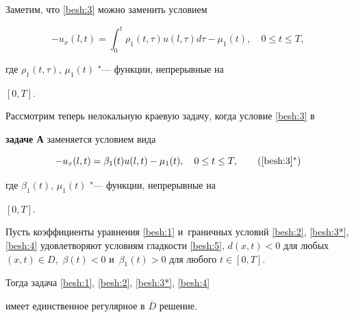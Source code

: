 Заметим, что \eqref{besh:3} можно заменить условием

$$

-u_{x}(l,t)=\int^{t}_{0}\rho_{1}(t,\tau)u(l,\tau)d\tau-\mu_{1}(t),

\quad 0 \leq t\leq T,

$$

где $\rho_{1}(t,\tau)$, $\mu_{1}(t)$ "--- функции, непрерывные на

$[0, T]$.%



\smallskip


Рассмотрим теперь нелокальную краевую задачу, когда условие \eqref{besh:3} в

\textbf{задаче А }заменяется условием вида

\begin{equation}

-u_{x}(l,t)=\beta_{1}(t) u(l,t)-\mu_{1}(t), \quad 0 \leq t\leq T,

\tag{\ref{besh:3}$^*$}

\label{besh:3*}

\end{equation}

где $\beta_{1}(t)$, $\mu_{1}(t)$ "--- функции, непрерывные на

$[0,T]$.%



\smallskip



\begin{theorem}[2]Пусть коэффициенты уравнения \eqref{besh:1} и~граничных условий \eqref{besh:2}{\rm ,} \eqref{besh:3*}{\rm ,} \eqref{besh:4} удовлетворяют условиям гладкости \eqref{besh:5}{\rm ,} $d(x,t)<0$ для любых $(x,t) \in D,$ $\beta(t)<0$ и~$\beta_{1}(t)>0$ для любого $t \in [0, T].$ 

Тогда задача \eqref{besh:1}{\rm ,} \eqref{besh:2}{\rm ,} \eqref{besh:3*}{\rm ,} \eqref{besh:4}

имеет единственное регулярное в $\overline{D}$ решение{\rm .}

\end{theorem}



\smallskip



